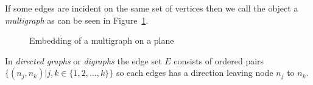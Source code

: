If some edges are incident on the same set of vertices then we call the object a \textit{multigraph} as can be seen in Figure~\ref{fig:multi}.

\begin{figure}[h]
  \caption{Embedding of a multigraph on a plane}
  \label{fig:multi}
\end{figure}

In \textit{directed graphs} or \textit{digraphs} the edge set $ E $ consists of ordered pairs $ \{(n_j, n_k) | j,k \in \{1, 2, ..., k\}\} $ so each edges has a direction leaving node $ n_j $ to $ n_k $.


